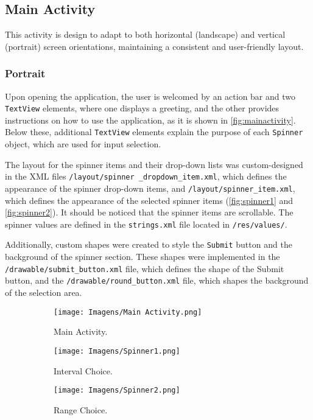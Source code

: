 \documentclass{article}
\begin{document}
\subsection{Main Activity}
This activity is design to adapt to both horizontal (landscape) and vertical (portrait) screen orientations, maintaining a consistent and user-friendly layout.

\subsubsection{Portrait}
Upon opening the application, the user is welcomed by an action bar and two \texttt{TextView} elements, where one displays a greeting, and the other provides instructions on how to use the application, as it is shown in \autoref{fig:mainactivity}. 
Below these, additional \texttt{TextView} elements explain the purpose of each \texttt{Spinner} object, which are used for input selection.

The layout for the spinner items and their drop-down lists was custom-designed in the XML files \texttt{/layout/spinner \_dropdown\_item.xml}, which defines the appearance of the spinner drop-down items, and \texttt{/layout/spinner\_item.xml}, which defines the appearance of the selected spinner items (\autoref{fig:spinner1} and \autoref{fig:spinner2}).
It should be noticed that the spinner items are scrollable.
The spinner values are defined in the \texttt{strings.xml} file located in \texttt{/res/values/}. 


Additionally, custom shapes were created to style the \texttt{Submit} button and the background of the spinner section. 
These shapes were implemented in the \texttt{/drawable/submit\_button.xml} file, which defines the shape of the Submit button, and the \texttt{/drawable/round\_button.xml} file, which shapes the background of the selection area.


\begin{figure}[ht]
    \centering
    
    \begin{subfigure}[t]{0.30\linewidth}
        \centering
        \texttt{[image: Imagens/Main Activity.png]}
        \caption{Main Activity.}
        \label{fig:mainactivity}
    \end{subfigure}
    \hfill
    \begin{subfigure}[t]{0.30\textwidth}
        \centering
        \texttt{[image: Imagens/Spinner1.png]}
        \caption{Interval Choice.}
        \label{fig:spinner1}
    \end{subfigure}
    \hfill
    \begin{subfigure}[t]{0.30\textwidth}
        \centering
        \texttt{[image: Imagens/Spinner2.png]}
        \caption{Range Choice.}
        \label{fig:spinner2}
    \end{subfigure}

    \caption{Main Activity.}
    \label{fig:whole main activity}
\end{figure}
\end{document}
